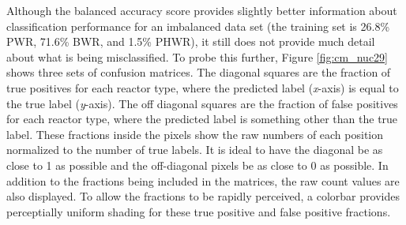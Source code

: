 Although the balanced accuracy score provides slightly better information about
classification performance for an imbalanced data set (the training set is
26.8\% \gls{PWR}, 71.6\% \gls{BWR}, and 1.5\% \gls{PHWR}), it still does not
provide much detail about what is being misclassified. To probe this further,
Figure \ref{fig:cm_nuc29} shows three sets of confusion matrices.  The diagonal
squares are the fraction of true positives for each reactor type, where the
predicted label (\textit{x}-axis) is equal to the true label (\textit{y}-axis).
The off diagonal squares are the fraction of false positives for each reactor
type, where the predicted label is something other than the true label.  These
fractions inside the pixels show the raw numbers of each position normalized to
the number of true labels.  It is ideal to have the diagonal be as close to 1
as possible and the off-diagonal pixels be as close to 0 as possible.  In
addition to the fractions being included in the matrices, the raw count values
are also displayed. To allow the fractions to be rapidly perceived, a colorbar
provides perceptially uniform shading for these true positive and false
positive fractions. 

